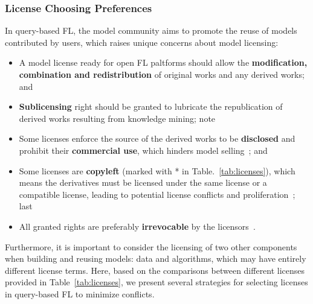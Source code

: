 

\subsubsection{License Choosing Preferences}
\label{sec:choosing}
In query-based FL, the model community aims to promote the reuse of models contributed by users, which raises unique concerns about model licensing:
\begin{itemize}
  \item A model license ready for open FL paltforms should allow the \textbf{modification, combination and redistribution} of original works and any derived works; and
  \item \textbf{Sublicensing} right should be granted to lubricate the republication of derived works resulting from knowledge mining; note
  \item Some licenses enforce the source of the derived works to be \textbf{disclosed} and prohibit their \textbf{commercial use}, which hinders model selling~\cite{chen2019towards}; and
  \item Some licenses are \textbf{copyleft} (marked with * in Table.~\ref{tab:licenses}), which means the derivatives must be licensed under the same license or a compatible license, leading to potential license conflicts and proliferation~\cite{gomulkiewicz2009open}; last
  \item All granted rights are preferably \textbf{irrevocable} by the licensors~\cite{reddy2009jacobsen}.
\end{itemize}

Furthermore, it is important to consider the licensing of two other components when building and reusing models: data and algorithms, which may have entirely different license terms. 
Here, based on the comparisons between different licenses provided in Table~\ref{tab:licenses}, we present several strategies for selecting licenses in query-based FL to minimize conflicts.

